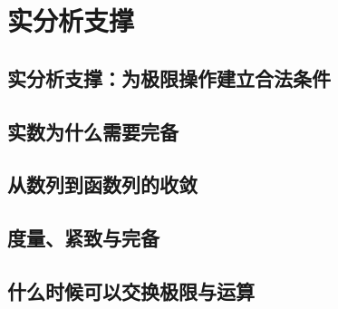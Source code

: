 \documentclass[UTF8,openany]{ctexbook}
\theoremstyle{definition}
\theoremstyle{plain}
\begin{document}
\part{实分析支撑}
\chapter*{实分析支撑：为极限操作建立合法条件}
\label{ch:096}

\clearpage
\chapter*{实数为什么需要完备}
\label{ch:097}



\clearpage
\chapter*{从数列到函数列的收敛}
\label{ch:098}



\clearpage
\chapter*{度量、紧致与完备}
\label{ch:099}




\clearpage
\chapter*{什么时候可以交换极限与运算}
\label{ch:100}




\clearpage
\end{document}
